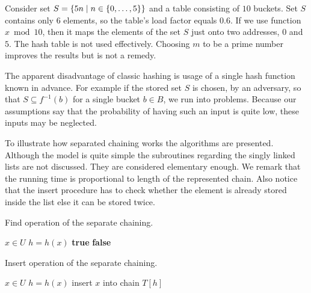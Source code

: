 \begin{example}
Consider set $S = \{5n \mid n \in \{0, \dots, 5\} \}$ and a table consisting of $10$ buckets. Set $S$ contains only 6 elements, so the table's load factor equals $0.6$. If we use function $x \bmod 10$, then it maps the elements of the set $S$ just onto two addresses, $0$ and $5$. The hash table is not used effectively. Choosing $m$ to be a prime number improves the results but is not a remedy.
\end{example}

The apparent disadvantage of classic hashing is usage of a single hash function known in advance. For example if  the stored set $S$ is chosen, by an adversary, so that $S \subseteq f^{-1}(b)$ for a single bucket $b \in B$, we run into problems. Because our assumptions say that the probability of having such an input is quite low, these inputs may be neglected.

To illustrate how separated chaining works the algorithms are presented. Although the model is quite simple the subroutines regarding the singly linked lists are not discussed. They are considered elementary enough. We remark that the running time is proportional to length of the represented chain. Also notice that the insert procedure has to check whether the element is already stored inside the list else it can be stored twice. 

\begin{algorithm}[ht]
\caption{Find operation of the separate chaining.}
\label{algorithm-find-separate-chaining}
\begin{algorithmic}
\REQUIRE $x \in U$
\STATE $h = h(x)$
\STATE
{}
	\RETURN \textbf{true} 
\ELSE
	\RETURN \textbf{false} 
\ENDIF
\end{algorithmic}
\end{algorithm}

\begin{algorithm}[ht]
\caption{Insert operation of the separate chaining.}
\label{algorithm-insert-separate-chaining}
\begin{algorithmic}
\REQUIRE $x \in U$
\STATE $h = h(x)$
\STATE
{}
	\STATE insert $x$ into chain $T[h]$
\ENDIF
\end{algorithmic}
\end{algorithm}

